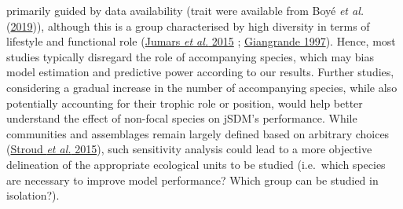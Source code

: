 \documentclass[9pt,biorxiv,doublespacing,lineno,endfloat]{lapreprint}
\begin{document}
primarily guided by data availability (trait were available from Boyé
\emph{et al.} (\protect\hyperlink{ref-Boye_2019a}{2019})), although this
is a group characterised by high diversity in terms of lifestyle and
functional role (\protect\hyperlink{ref-Jumars_2015}{Jumars \emph{et
al.} 2015} ; \protect\hyperlink{ref-Giangrande_1997}{Giangrande 1997}).
Hence, most studies typically disregard the role of accompanying
species, which may bias model estimation and predictive power according
to our results. Further studies, considering a gradual increase in the
number of accompanying species, while also potentially accounting for
their trophic role or position, would help better understand the effect
of non-focal species on jSDM's performance. While communities and
assemblages remain largely defined based on arbitrary choices
(\protect\hyperlink{ref-Stroud_2015}{Stroud \emph{et al.} 2015}), such
sensitivity analysis could lead to a more objective delineation of the
appropriate ecological units to be studied (i.e.~which species are
necessary to improve model performance? Which group can be studied in
isolation?).
\end{document}
